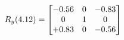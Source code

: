 \documentclass[preview]{standalone}
\begin{document}
\begin{align*}
\special{dvisvgm:raw <g id='unique000'>}R_{y}(4.12) = \begin{bmatrix}-0.56 & 0 & -0.83 \\0 & 1 & 0 \\+0.83 & 0 & -0.56\end{bmatrix}\special{dvisvgm:raw </g>}
\end{align*}
\end{document}
